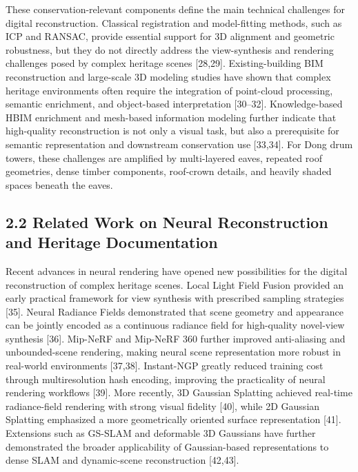 These conservation-relevant components define the main technical
challenges for digital reconstruction. Classical registration and
model-fitting methods, such as ICP and RANSAC, provide essential support
for 3D alignment and geometric robustness, but they do not directly
address the view-synthesis and rendering challenges posed by complex
heritage scenes {[}28,29{]}. Existing-building BIM reconstruction and
large-scale 3D modeling studies have shown that complex heritage
environments often require the integration of point-cloud processing,
semantic enrichment, and object-based interpretation {[}30--32{]}.
Knowledge-based HBIM enrichment and mesh-based information modeling
further indicate that high-quality reconstruction is not only a visual
task, but also a prerequisite for semantic representation and downstream
conservation use {[}33,34{]}. For Dong drum towers, these challenges are
amplified by multi-layered eaves, repeated roof geometries, dense timber
components, roof-crown details, and heavily shaded spaces beneath the
eaves.

\subsection{2.2 Related Work on Neural Reconstruction and Heritage
Documentation}\label{related-work-on-neural-reconstruction-and-heritage-documentation}

Recent advances in neural rendering have opened new possibilities for
the digital reconstruction of complex heritage scenes. Local Light Field
Fusion provided an early practical framework for view synthesis with
prescribed sampling strategies {[}35{]}. Neural Radiance Fields
demonstrated that scene geometry and appearance can be jointly encoded
as a continuous radiance field for high-quality novel-view synthesis
{[}36{]}. Mip-NeRF and Mip-NeRF 360 further improved anti-aliasing and
unbounded-scene rendering, making neural scene representation more
robust in real-world environments {[}37,38{]}. Instant-NGP greatly
reduced training cost through multiresolution hash encoding, improving
the practicality of neural rendering workflows {[}39{]}. More recently,
3D Gaussian Splatting achieved real-time radiance-field rendering with
strong visual fidelity {[}40{]}, while 2D Gaussian Splatting emphasized
a more geometrically oriented surface representation {[}41{]}.
Extensions such as GS-SLAM and deformable 3D Gaussians have further
demonstrated the broader applicability of Gaussian-based representations
to dense SLAM and dynamic-scene reconstruction {[}42,43{]}.


